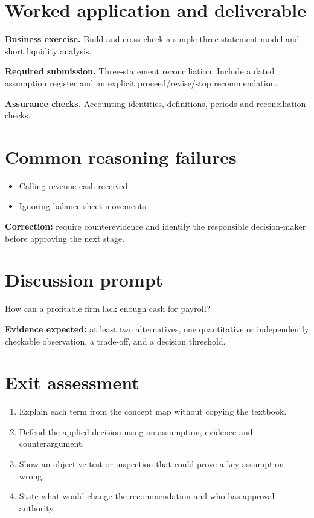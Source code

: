 \documentclass[11pt,letterpaper]{article}
\begin{document}
\section{Worked application and deliverable}
\textbf{Business exercise.} Build and cross-check a simple three-statement model and short liquidity analysis.\par\textbf{Required submission.} Three-statement reconciliation. Include a dated assumption register and an explicit proceed/revise/stop recommendation.\par\textbf{Assurance checks.} Accounting identities, definitions, periods and reconciliation checks.
\section{Common reasoning failures}
\begin{itemize}[leftmargin=*,itemsep=3pt]
\item Calling revenue cash received
\item Ignoring balance-sheet movements
\end{itemize}
\noindent\textbf{Correction:} require counterevidence and identify the responsible decision-maker before approving the next stage.
\section{Discussion prompt}
How can a profitable firm lack enough cash for payroll?\par\medskip\textbf{Evidence expected:} at least two alternatives, one quantitative or independently checkable observation, a trade-off, and a decision threshold.
\section{Exit assessment}
\begin{enumerate}[leftmargin=*,itemsep=5pt]
\item Explain each term from the concept map without copying the textbook.
\item Defend the applied decision using an assumption, evidence and counterargument.
\item Show an objective test or inspection that could prove a key assumption wrong.
\item State what would change the recommendation and who has approval authority.
\end{enumerate}

\end{document}
